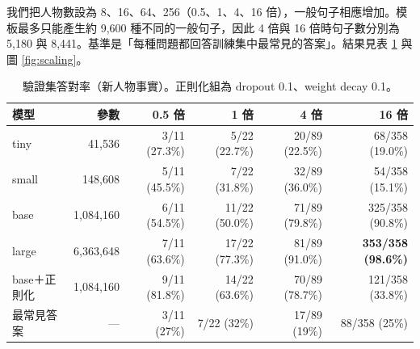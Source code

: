 \documentclass[11pt,a4paper]{article}
\begin{document}
我們把人物數設為 8、16、64、256（0.5、1、4、16 倍），一般句子相應增加。模板最多只能產生約 9,600 種不同的一般句子，因此 4 倍與 16 倍時句子數分別為 5,180 與 8,441。基準是「每種問題都回答訓練集中最常見的答案」。結果見表 \ref{tab:scaling} 與圖 \ref{fig:scaling}。

\begin{table}[H]
\centering
\caption{驗證集答對率（新人物事實）。正則化組為 dropout 0.1、weight decay 0.1。}\label{tab:scaling}
\small
\begin{tabular}{lrrrrr}
\toprule
模型 & 參數 & 0.5 倍 & 1 倍 & 4 倍 & 16 倍 \\
\midrule
tiny & 41,536 & 3/11 (27.3\%) & 5/22 (22.7\%) & 20/89 (22.5\%) & 68/358 (19.0\%) \\
small & 148,608 & 5/11 (45.5\%) & 7/22 (31.8\%) & 32/89 (36.0\%) & 54/358 (15.1\%) \\
base & 1,084,160 & 6/11 (54.5\%) & 11/22 (50.0\%) & 71/89 (79.8\%) & 325/358 (90.8\%) \\
large & 6,363,648 & 7/11 (63.6\%) & 17/22 (77.3\%) & 81/89 (91.0\%) & \textbf{353/358 (98.6\%)} \\
\midrule
base＋正則化 & 1,084,160 & 9/11 (81.8\%) & 14/22 (63.6\%) & 70/89 (78.7\%) & 121/358 (33.8\%) \\
最常見答案 & --- & 3/11 (27\%) & 7/22 (32\%) & 17/89 (19\%) & 88/358 (25\%) \\
\bottomrule
\end{tabular}
\end{table}
\end{document}

